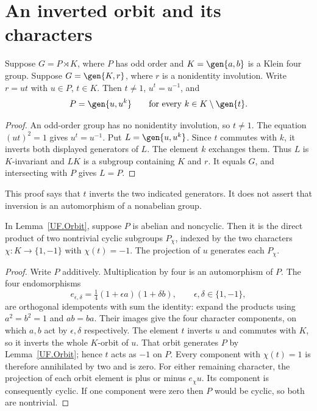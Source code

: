 \section{An inverted orbit and its characters}
\begin{lemma}\label{UF.Orbit}
Suppose $G=P\rtimes K$, where $P$ has odd order and
$K=\gen{a,b}$ is a Klein four group. Suppose $G=\gen{K,r}$,
where $r$ is a nonidentity involution. Write $r=ut$ with
$u\in P$, $t\in K$. Then $t\ne1$, $u^t=u^{-1}$, and
\[
 P=\gen{u,u^k}\qquad\text{for every }k\in K\setminus\gen{t}.
\]
\end{lemma}
\begin{proof}
An odd-order group has no nonidentity involution, so $t\ne1$.
The equation $(ut)^2=1$ gives $u^t=u^{-1}$. Put
$L=\gen{u,u^k}$. Since $t$ commutes with $k$, it inverts both
displayed generators of $L$. The element $k$ exchanges them. Thus
$L$ is $K$-invariant and $LK$ is a subgroup containing $K$ and $r$.
It equals $G$, and intersecting with $P$ gives $L=P$.
\end{proof}
This proof says that $t$ inverts the two indicated generators. It does
not assert that inversion is an automorphism of a nonabelian group.

\begin{lemma}\label{UF.Characters}
In Lemma~\ref{UF.Orbit}, suppose $P$ is abelian and noncyclic.
Then it is the direct product of two nontrivial cyclic subgroups
$P_\chi$, indexed by the two characters
$\chi:K\longrightarrow\{1,-1\}$ with $\chi(t)=-1$.
The projection of $u$ generates each $P_\chi$.
\end{lemma}
\begin{proof}
Write $P$ additively. Multiplication by four is an automorphism of $P$.
The four endomorphisms
\[
 e_{\epsilon,\delta}=\tfrac14(1+\epsilon a)(1+\delta b),
 \qquad\epsilon,\delta\in\{1,-1\},
\]
are orthogonal idempotents with sum the identity: expand the products
using $a^2=b^2=1$ and $ab=ba$. Their images give the four character
components, on which $a,b$ act by $\epsilon,\delta$ respectively.
The element $t$ inverts $u$ and commutes with $K$, so it inverts the
whole $K$-orbit of $u$. That orbit generates $P$ by
Lemma~\ref{UF.Orbit}; hence $t$ acts as $-1$ on $P$.
Every component with $\chi(t)=1$ is therefore annihilated by two and
is zero. For either remaining character, the projection of each orbit
element is plus or minus $e_\chi u$. Its component is consequently
cyclic. If one component were zero then $P$ would be cyclic, so both
are nontrivial.
\end{proof}
